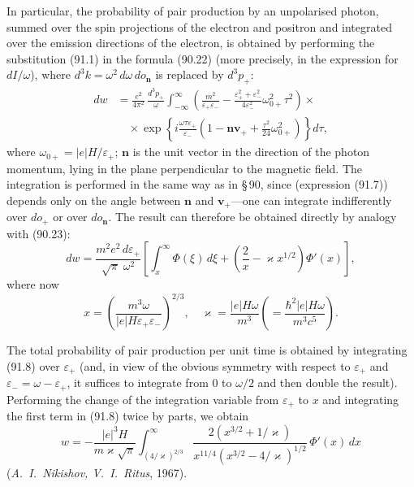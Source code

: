 In particular, the probability of pair production by an unpolarised photon, summed over the spin projections of the electron and positron and integrated over the emission directions of the electron, is obtained by performing the substitution (91.1) in the formula (90.22) (more precisely, in the expression for $dI/\omega$), where $d^3k = \omega^2\,d\omega\,do_\mathbf{n}$ is replaced by $d^3p_+$:
\begin{equation}
\begin{split}
dw &= \frac{e^2}{4\pi^2}\,\frac{d^3p_+}{\omega}\int_{-\infty}^{\infty}\left(\frac{m^2}{\varepsilon_+\varepsilon_-} - \frac{\varepsilon_+^2+\varepsilon_-^2}{4\varepsilon_-^2}\omega_{0+}^2\tau^2\right) \times {} \\
&\quad \times \exp\!\left\{i\frac{\omega\tau\varepsilon_+}{\varepsilon_-}\left(1 - \mathbf{nv}_+ + \frac{\tau^2}{24}\omega_{0+}^2\right)\right\}d\tau,
\end{split}
\label{eq:91.7}
\end{equation}
where $\omega_{0+} = |e|H/\varepsilon_+$; $\mathbf{n}$ is the unit vector in the direction of the photon momentum, lying in the plane perpendicular to the magnetic field. The integration is performed in the same way as in \S\,90, since (expression (91.7)) depends only on the angle between $\mathbf{n}$ and $\mathbf{v}_+$---one can integrate indifferently over $do_+$ or over $do_\mathbf{n}$. The result can therefore be obtained directly by analogy with (90.23):
\begin{equation}
dw = \frac{m^2 e^2\,d\varepsilon_+}{\sqrt{\pi}\;\omega^2}\left[\int_x^\infty \Phi(\xi)\,d\xi + \left(\frac{2}{x} - \varkappa x^{1/2}\right)\Phi'(x)\right],
\label{eq:91.8}
\end{equation}
where now
\begin{equation}
x = \left(\frac{m^3\omega}{|e|H\varepsilon_+\varepsilon_-}\right)^{\!2/3}, \quad \varkappa = \frac{|e|H\omega}{m^3}\left(= \frac{\hbar^2|e|H\omega}{m^3c^5}\right).
\label{eq:91.9}
\end{equation}


The total probability of pair production per unit time is obtained by integrating (91.8) over $\varepsilon_+$ (and, in view of the obvious symmetry with respect to $\varepsilon_+$ and $\varepsilon_- = \omega - \varepsilon_+$, it suffices to integrate from 0 to $\omega/2$ and then double the result). Performing the change of the integration variable from $\varepsilon_+$ to $x$ and integrating the first term in (91.8) twice by parts, we obtain
\begin{equation}
w = -\frac{|e|^3H}{m\varkappa\sqrt{\pi}}\int_{(4/\varkappa)^{2/3}}^{\infty}\frac{2(x^{3/2}+1/\varkappa)}{x^{11/4}(x^{3/2}-4/\varkappa)^{1/2}}\,\Phi'(x)\,dx
\label{eq:91.10}
\end{equation}
(\emph{A.~I.~Nikishov, V.~I.~Ritus}, 1967).

